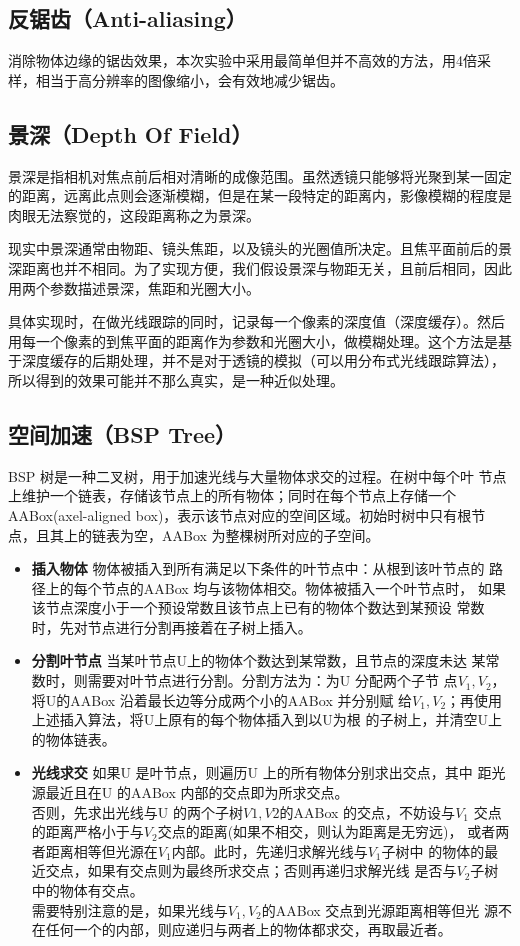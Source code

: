 \documentclass{article}
\begin{document}
\subsection{反锯齿（Anti-aliasing）}
消除物体边缘的锯齿效果，本次实验中采用最简单但并不高效的方法，用4倍采样，相当于高分辨率的图像缩小，会有效地减少锯齿。
\subsection{景深（Depth Of Field）} 
景深是指相机对焦点前后相对清晰的成像范围。虽然透镜只能够将光聚到某一固定的距离，远离此点则会逐渐模糊，但是在某一段特定的距离内，影像模糊的程度是肉眼无法察觉的，这段距离称之为景深。\par
现实中景深通常由物距、镜头焦距，以及镜头的光圈值所决定。且焦平面前后的景深距离也并不相同。为了实现方便，我们假设景深与物距无关，且前后相同，因此用两个参数描述景深，焦距和光圈大小。\par
具体实现时，在做光线跟踪的同时，记录每一个像素的深度值（深度缓存）。然后用每一个像素的到焦平面的距离作为参数和光圈大小，做模糊处理。这个方法是基于深度缓存的后期处理，并不是对于透镜的模拟（可以用分布式光线跟踪算法），所以得到的效果可能并不那么真实，是一种近似处理。
\subsection{空间加速（BSP Tree）}
BSP 树是一种二叉树，用于加速光线与大量物体求交的过程。在树中每个叶
节点上维护一个链表，存储该节点上的所有物体；同时在每个节点上存储一个
AABox(axel-aligned box)，表示该节点对应的空间区域。初始时树中只有根节
点，且其上的链表为空，AABox 为整棵树所对应的子空间。
\begin{itemize}
\item \textbf{插入物体} 物体被插入到所有满足以下条件的叶节点中：从根到该叶节点的
路径上的每个节点的AABox 均与该物体相交。物体被插入一个叶节点时，
如果该节点深度小于一个预设常数且该节点上已有的物体个数达到某预设
常数时，先对节点进行分割再接着在子树上插入。
\item \textbf{分割叶节点} 当某叶节点U上的物体个数达到某常数，且节点的深度未达
某常数时，则需要对叶节点进行分割。分割方法为：为U 分配两个子节
点$V_1,V_2$，将U的AABox 沿着最长边等分成两个小的AABox 并分别赋
给$V_1,V_2$；再使用上述插入算法，将U上原有的每个物体插入到以U为根
的子树上，并清空U上的物体链表。
\item \textbf{光线求交} 如果U 是叶节点，则遍历U 上的所有物体分别求出交点，其中
距光源最近且在U 的AABox 内部的交点即为所求交点。\\
否则，先求出光线与U 的两个子树$V1,V2 $的AABox 的交点，不妨设与$V_1$
交点的距离严格小于与$V_2$交点的距离(如果不相交，则认为距离是无穷远)，
或者两者距离相等但光源在$V_1$内部。此时，先递归求解光线与$V_1$子树中
的物体的最近交点，如果有交点则为最终所求交点；否则再递归求解光线
是否与$V_2$子树中的物体有交点。\\
需要特别注意的是，如果光线与$V_1,V_2$的AABox 交点到光源距离相等但光
源不在任何一个的内部，则应递归与两者上的物体都求交，再取最近者。
\end{itemize}
\vspace{0.5em}
\end{document}
